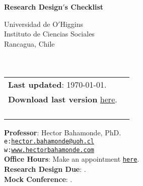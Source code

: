 \documentclass[letterpaper]{article}
\def\name{Research Design$'$s Checklist}
\begin{document}

\centerline{\huge \bf \name}

\vspace{0.25in}

\begin{minipage}{0.45\linewidth}
 Universidad de O$'$Higgins \\
  Instituto de Ciencias Sociales \\
  Rancagua, Chile\\
  \\
  \\

\end{minipage}
\hspace{4cm}\begin{minipage}{0.45\linewidth}
  \begin{tabular}{ll}
{\bf Last updated}: \today. \\
 {\bf Download last version} \href{https://github.com/hbahamonde/Social_Sciences_Epistemology_UGRAD/raw/master/Design/Design_Check_List.pdf}{here}.%
    \\
    \\
    \\
    \\
    \\
  \end{tabular}
\end{minipage}

\vspace{-5mm}
{\bf Professor}: Hector Bahamonde, PhD.\\
\texttt{e:}\href{mailto:hector.bahamonde@uoh.cl}{\texttt{hector.bahamonde@uoh.cl}}\\
\texttt{w:}\href{http://www.hectorbahamonde.com}{\texttt{www.hectorbahamonde.com}}\\
{\bf Office Hours}: Make an appointment \href{https://calendly.com/bahamonde/officehours}{\texttt{here}}.\\

\vspace{1mm}
{\bf Research Design Due}: {\unskip}.\\
{\bf Mock Conference}: {\unskip}.
\end{document}

